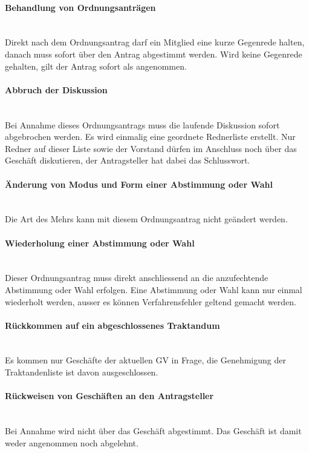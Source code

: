\documentclass[a4paper,11pt]{article}
\begin{document}
\paragraph{Behandlung von Ordnungsanträgen} \ \\
Direkt nach dem Ordnungsantrag darf ein Mitglied eine kurze Gegenrede halten, danach muss sofort über den Antrag abgestimmt werden. Wird keine Gegenrede gehalten, gilt der Antrag sofort als angenommen.


\paragraph{Abbruch der Diskussion} \ \\
Bei Annahme dieses Ordnungsantrags muss die laufende Diskussion sofort abgebrochen werden. Es wird einmalig eine geordnete Rednerliste erstellt. Nur Redner auf dieser Liste sowie der Vorstand dürfen im Anschluss noch über das Geschäft diskutieren, der Antragsteller hat dabei das Schlusswort.


\paragraph{Änderung von Modus und Form einer Abstimmung oder Wahl} \ \\
Die Art des Mehrs kann mit diesem Ordnungsantrag nicht geändert werden.


\paragraph{Wiederholung einer Abstimmung oder Wahl} \ \\
Dieser Ordnungsantrag muss direkt anschliessend an die anzufechtende Abstimmung oder Wahl erfolgen. Eine Abstimmung oder Wahl kann nur einmal wiederholt werden, ausser es können Verfahrensfehler geltend gemacht werden.


\paragraph{Rückkommen auf ein abgeschlossenes Traktandum} \ \\
Es kommen nur Geschäfte der aktuellen GV in Frage, die Genehmigung der Traktandenliste ist davon ausgeschlossen.


\paragraph{Rückweisen von Geschäften an den Antragsteller} \ \\
Bei Annahme wird nicht über das Geschäft abgestimmt. Das Geschäft ist damit weder angenommen noch abgelehnt.
\end{document}
